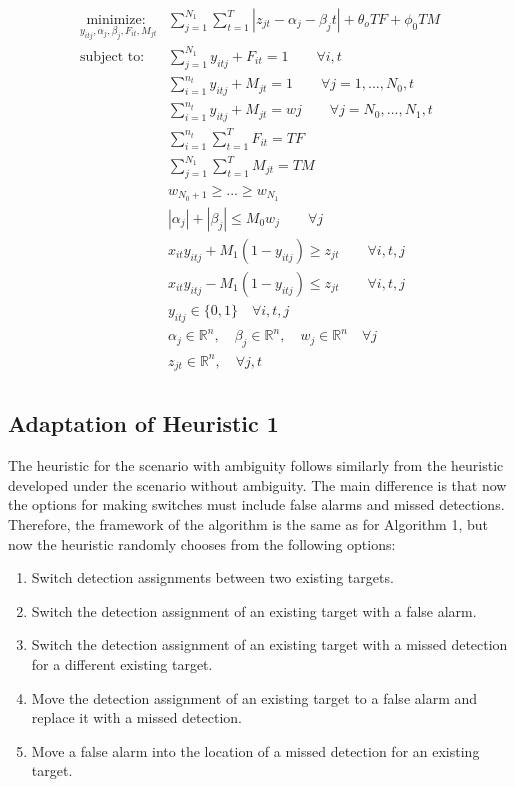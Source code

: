 \documentclass[journal]{IEEEtran}
\begin{document}
\begin{align*}
\underset{y_{itj}, \alpha_{j}, \beta_{j},F_{it},M_{jt}}{\text{minimize: }} & \sum_{j=1}^{N_{1}} \sum_{t=1}^{T} |z_{jt} - \alpha_{j} - \beta_{j}t| + \theta_{o} TF + \phi_{0} TM\\
\text{subject to: }	& \sum_{j=1}^{N_{1}} y_{itj} + F_{it} = 1 \qquad \forall i,t\\
				& \sum_{i=1}^{n_{t}} y_{itj} + M_{jt} = 1 \qquad \forall j=1,...,N_{0},t\\
				& \sum_{i=1}^{n_{t}} y_{itj} + M_{jt} = w{j} \qquad \forall j=N_{0},...,N_{1},t\\
				& \sum_{i=1}^{n_{t}} \sum_{t=1}^{T} F_{it} = TF\\
				& \sum_{j=1}^{N_{1}} \sum_{t=1}^{T} M_{jt} = TM\\
				& w_{N_0+1}\geq ...\geq w_{N_1}\\
				& |\alpha_{j}|+|\beta_{j}| \leq M_{0}w_{j}\qquad \forall j\\
				& x_{it}y_{itj} + M_{1}(1-y_{itj}) \geq z_{jt} \qquad \forall i,t,j\\
				& x_{it}y_{itj} - M_{1}(1-y_{itj}) \leq z_{jt} \qquad \forall i,t,j\\
			 	& y_{itj} \in \{0,1\} \quad \forall i,t,j\\
				& \alpha_{j} \in \mathbb{R}^n,\quad \beta_{j} \in \mathbb{R}^n,\quad w_{j} \in \mathbb{R}^n \quad \forall j\\
				& z_{jt} \in \mathbb{R}^n, \quad \forall j,t\\
\end{align*}

\subsection{Adaptation of Heuristic 1}
The heuristic for the scenario with ambiguity follows similarly from the heuristic developed under the scenario without ambiguity. The main difference is that now the options for making switches must include false alarms and missed detections. Therefore, the framework of the algorithm is the same as for Algorithm 1, but now the heuristic randomly chooses from the following options: 
\begin{enumerate}
  \item Switch detection assignments between two existing targets.
  \item Switch the detection assignment of an existing target with a false alarm.
  \item Switch the detection assignment of an existing target with a missed detection for a different existing target.
  \item Move the detection assignment of an existing target to a false alarm and replace it with a missed detection.
  \item Move a false alarm into the location of a missed detection for an existing target.
\end{enumerate}
\end{document}
